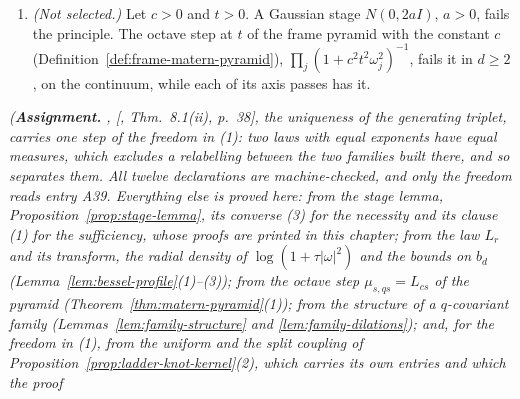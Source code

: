 \begin{theorem}
\begin{enumerate}
between other scales.
\item \emph{(Not selected.)} Let $c > 0$ and $t > 0$. A Gaussian stage $N(0, 2aI)$, $a > 0$, fails
the principle. The octave step at $t$ of the frame \Matern{} pyramid with the constant $c$
(Definition~\ref{def:frame-matern-pyramid}),
$\prod_j(1 + c^2t^2\omega_j^2)^{-1}$, fails it in $d \ge 2$, on the continuum, while each of its
axis passes has it.
\end{enumerate}
\statusA\quad{}\quad\emph{(\textbf{Assignment.} , [,
Thm.~8.1(ii), p.~38], the uniqueness of the generating triplet, carries one step of the freedom
in (1): two laws with equal exponents have equal \Levy{} measures, which excludes a relabelling
between the two families built there, and so separates them. All twelve declarations are
machine-checked, and only the freedom reads entry A39. Everything
else is proved here: from the stage lemma, Proposition~\ref{prop:stage-lemma}, its converse (3)
for the necessity and its clause (1) for the sufficiency, whose proofs are printed in this
chapter; from the law $L_r$ and its transform, the radial density of $\log(1 + \tau|\omega|^2)$ and
the bounds on $b_d$ (Lemma~\ref{lem:bessel-profile}(1)--(3)); from the octave step
$\mu_{s,qs} = L_{cs}$ of the \Matern{} pyramid (Theorem~\ref{thm:matern-pyramid}(1)); from the
structure of a $q$-covariant family (Lemmas~\ref{lem:family-structure} and
\ref{lem:family-dilations}); and, for the freedom in (1), from the uniform and the split coupling of
Proposition~\ref{prop:ladder-knot-kernel}(2), which carries its own entries and which the proof
}
\end{theorem}
